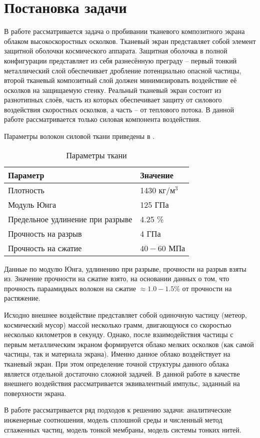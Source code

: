 \section{Постановка задачи}\label{sec:intro-problem}

В работе рассматривается задача о пробивании тканевого композитного экрана облаком высокоскоростных осколков. 
Тканевый экран представляет собой элемент защитной оболочки космического аппарата. Защитная оболочка в полной 
конфигурации представляет из себя разнесённую преграду -- первый тонкий металлический слой обеспечивает дробление 
потенциально опасной частицы, второй тканевый композитный слой должен минимизировать воздействие её осколков на 
защищаемую стенку. Реальный тканевый экран состоит из разнотипных слоёв, часть из которых обеспечивает 
защиту от силового воздействия скоростных осколков, а часть -- от теплового потока. В данной работе 
рассматривается только силовая компонента воздействия.

Параметры волокон силовой ткани приведены в .

\begin{table}[h]
    \centering
    \caption{Параметры ткани}\label{tbl:kevlar-params}
    \begin{tabular}{|l|l|}
        \hline
        Параметр & Значение      \\ \hline
        Плотность & 1430 $кг/м^3$ \\ \hline
        Модуль Юнга & 125 ГПа       \\ \hline
        Предельное удлинение при разрыве & 4.25 \%       \\ \hline
        Прочность на разрыв & 4 ГПа         \\ \hline
        Прочность на сжатие & $40-60$ МПа     \\ \hline
    \end{tabular}
\end{table}

Данные по модулю Юнга, удлинению при разрыве, прочности на разрыв взяты из\cite{perepelkin2009,mikhailin2013}.
Значение прочности на сжатие взято, на основании данных\cite{papkov1986} о том, что прочность параамидных волокон
на сжатие $\approx 1.0 - 1.5 \%$ от прочности на растяжение.

Исходно внешнее воздействие представляет собой одиночную частицу (метеор, космический мусор) массой несколько грамм, 
двигающуюся со скоростью несколько километров в секунду. Однако, после взаимодействия частицы с первым металлическим 
экраном формируется облако мелких осколков (как самой частицы, так и материала экрана). Именно данное облако воздействует 
на тканевый экран. При этом определение точной структуры данного облака является отдельной достаточно сложной задачей. 
В данной работе в качестве внешнего воздействия рассматривается эквивалентный импульс, заданный на поверхности экрана.

В работе рассматривается ряд подходов к решению задачи: 
аналитические инженерные соотношения, 
модель сплошной среды и численный метод сглаженных частиц, 
модель тонкой мембраны, 
модель системы тонких нитей.

